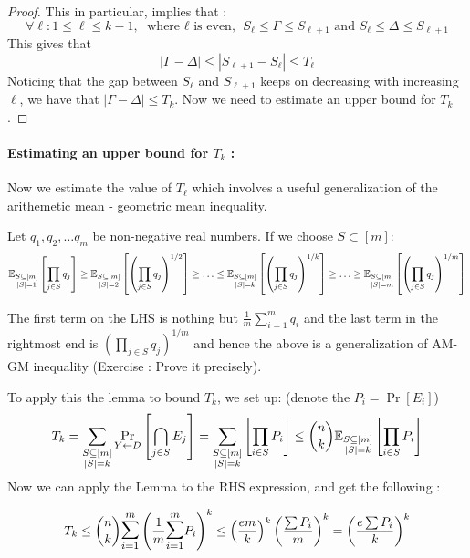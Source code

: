\begin{proof}
This in particular, implies that : 
$$\forall \ell : 1 \le \ell \le k-1, \textrm{ where $\ell$ is even, } S_{\ell} \le \Gamma \le S_{\ell+1} 
\textrm{ and } S_{\ell} \le \Delta \le S_{\ell+1} 
$$
This gives that 
$$\left| \Gamma - \Delta \right| \le  |S_{\ell+1} - S_{\ell}| \le T_\ell$$
Noticing that the gap between $S_\ell$ and $S_{\ell+1}$ keeps on decreasing with increasing $\ell$, we have that $\left| \Gamma - \Delta \right| \le T_k$. Now we need to estimate an upper bound for $T_k$.
\end{proof}

\paragraph{Estimating an upper bound for $T_k$ :}
Now we estimate the value of $T_\ell$ which involves a useful generalization of the arithemetic mean - geometric mean inequality.
\begin{lemma}
Let $q_1, q_2, \ldots q_m$ be non-negative real numbers. If we choose $S \subset [m]$:
$${\mathbb E}_{\substack{S \subseteq [m] \\ |S|=1}} \left[ \prod_{j \in S} q_j \right] \ge {\mathbb E}_{\substack{S \subseteq [m] \\ |S|=2}} \left[ \left(\prod_{j \in S} q_j \right)^{1/2} \right] \ge \ldots \le {\mathbb E}_{\substack{S \subseteq [m] \\ |S|=k}} \left[ \left( \prod_{j \in S} q_j \right)^{1/k} \right] \ge \ldots \ge  {\mathbb E}_{\substack{S \subseteq [m] \\ |S|=m}} \left[ \left( \prod_{j \in S} q_j \right)^{1/m}\right]$$
\end{lemma}
\noindent The first term on the LHS is nothing but $\frac{1}{m} \sum_{i=1}^m q_i$ and the last term in the rightmost end is $\left( \prod_{j \in S} q_j \right)^{1/m}$ and hence the above is a generalization of AM-GM inequality (Exercise : Prove it precisely).

To apply this the lemma to bound $T_k$, we set up:
(denote the $P_i = \Pr[E_i]$)
$$T_k = \sum_{\substack{S \subseteq [m]\\ |S| = k}} \Pr_{Y \leftarrow D} \left[ \bigcap_{j \in S} E_j \right] = \sum_{\substack{S \subseteq [m]\\ |S| = k}} \left[ \prod_{i \in S} P_i \right] \le {n \choose k} {\mathbb E}_{\substack{S \subseteq [m]\\ |S| = k}} \left[ \prod_{i \in S} P_i \right] $$
Now we can apply the Lemma to the RHS expression, and get the following :

$$T_k \le {n \choose k} \bigsum_{i=1}^m \left(\frac{1}{m}\bigsum_{i=1}^m P_i \right)^k \le \left( \frac{em}{k} \right)^k \left( \frac{\sum P_i}{m} \right)^k = \left( \frac{e \sum P_i}{k} \right)^k $$

